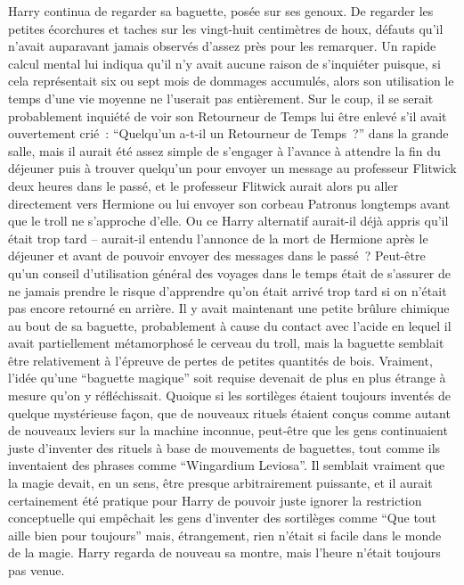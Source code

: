 Harry continua de regarder sa baguette, posée sur ses genoux. De regarder les petites écorchures et taches sur les vingt-huit centimètres de houx, défauts qu'il n'avait auparavant jamais observés d'assez près pour les remarquer. Un rapide calcul mental lui indiqua qu'il n'y avait aucune raison de s'inquiéter puisque, si cela représentait six ou sept mois de dommages accumulés, alors son utilisation le temps d'une vie moyenne ne l'userait pas entièrement. Sur le coup, il se serait probablement inquiété de voir son Retourneur de Temps lui être enlevé s'il avait ouvertement crié~: “Quelqu'un a-t-il un Retourneur de Temps~?” dans la grande salle, mais il aurait été assez simple de s'engager à l'avance à attendre la fin du déjeuner puis à trouver quelqu'un pour envoyer un message au professeur Flitwick deux heures dans le passé, et le professeur Flitwick aurait alors pu aller directement vers Hermione ou lui envoyer son corbeau Patronus longtemps avant que le troll ne s'approche d'elle. Ou ce Harry alternatif aurait-il déjà appris qu'il était trop tard -- aurait-il entendu l'annonce de la mort de Hermione après le déjeuner et avant de pouvoir envoyer des messages dans le passé~? Peut-être qu'un conseil d'utilisation général des voyages dans le temps était de s'assurer de ne jamais prendre le risque d'apprendre qu'on était arrivé trop tard si on n'était pas encore retourné en arrière. Il y avait maintenant une petite brûlure chimique au bout de sa baguette, probablement à cause du contact avec l'acide en lequel il avait partiellement métamorphosé le cerveau du troll, mais la baguette semblait être relativement à l'épreuve de pertes de petites quantités de bois. Vraiment, l'idée qu'une “baguette magique” soit requise devenait de plus en plus étrange à mesure qu'on y réfléchissait. Quoique si les sortilèges étaient toujours inventés de quelque mystérieuse façon, que de nouveaux rituels étaient conçus comme autant de nouveaux leviers sur la machine inconnue, peut-être que les gens continuaient juste d'inventer des rituels à base de mouvements de baguettes, tout comme ils inventaient des phrases comme “Wingardium Leviosa”. Il semblait vraiment que la magie devait, en un sens, être presque arbitrairement puissante, et il aurait certainement été pratique pour Harry de pouvoir juste ignorer la restriction conceptuelle qui empêchait les gens d'inventer des sortilèges comme “Que tout aille bien pour toujours” mais, étrangement, rien n'était si facile dans le monde de la magie. Harry regarda de nouveau sa montre, mais l'heure n'était toujours pas venue.

